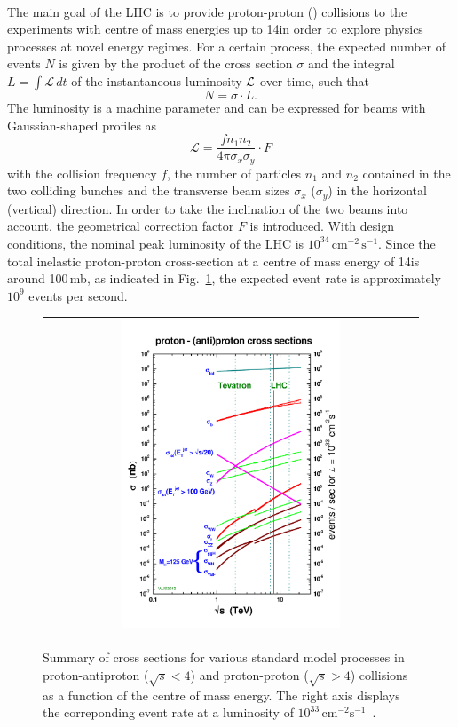\\
The main goal of the LHC is to provide proton-proton (\pp) collisions to the experiments with centre of mass energies up to 14\tev in order to explore physics processes at novel energy regimes. For a certain process, the expected number of events $N$ is given by the product of the cross section $\sigma$ and the integral $L = \int \mathcal{L}  \, dt$ of the instantaneous luminosity $\cal L$ over time, such that
\begin{equation}
  N = \sigma \cdot L . 
  \label{eq:lumi}
\end{equation}
The luminosity is a machine parameter and can be expressed for beams with Gaussian-shaped profiles as  
\begin{equation}
  \mathcal{L} = \frac{f n_{1} n_{2}}{4 \pi \sigma_{x} \sigma_{y}} \cdot F
  \label{eq:lumi}
\end{equation}
with the collision frequency $f$, the number of particles $n_1$ and $n_2$ contained in the two colliding bunches and the transverse beam sizes $\sigma_{x}$ ($\sigma_{y}$) in the horizontal (vertical) direction. In order to take the inclination of the two beams into account, the geometrical correction factor $F$ is introduced. With design conditions, the nominal peak luminosity of the LHC is $10^{34} \, \mathrm{cm}^{-2} \, \mathrm{s}^{-1}$. Since the total inelastic proton-proton cross-section at a centre of mass energy of 14\tev is around 100\,mb, as indicated in Fig.~\ref{fig:CrossSections}, the expected event rate is approximately $10^9$ events per second. \\
\begin{figure}[!tp]
  \centering
  \begin{tabular}{c}
    \includegraphics[width=0.60\textwidth]{figures/crosssections2012_v5-1.pdf}
  \end{tabular}
  \caption{Summary of cross sections for various standard model processes in proton-antiproton ($\sqrt{s} < 4$\tev) and proton-proton ($\sqrt{s} > 4$\tev) collisions as a function of the centre of mass energy. The right axis displays the correponding event rate at a luminosity of $\mathrm{10^{33}\,cm^{-2} s^{-1}}$~\cite{bib:stirling:pcom}.}
  \label{fig:CrossSections}
\end{figure}

